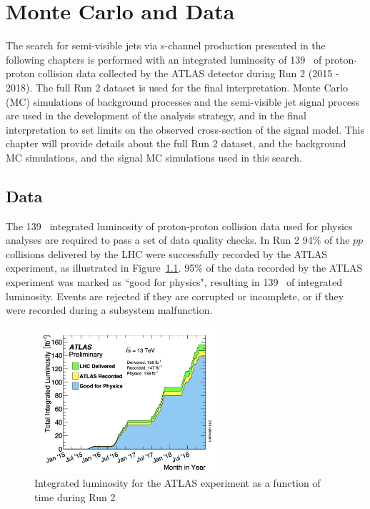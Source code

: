 \chapter{Monte Carlo and Data}
\label{ch:mc_data}

The search for semi-visible jets via s-channel production presented in the following chapters is performed with an integrated luminosity of 139 \fb~of proton-proton collision data collected by the ATLAS detector during Run 2 (2015 - 2018). The full Run 2 dataset is used for the final interpretation. Monte Carlo (MC) simulations of background processes and the semi-visible jet signal process are used in the development of the analysis strategy, and in the final interpretation to set limits on the observed cross-section of the signal model. This chapter will provide details about the full Run 2 dataset, and the background MC simulations, and the signal MC simulations used in this search. 

\section{Data}
The 139 \fb~integrated luminosity of proton-proton collision data used for physics analyses are required to pass a set of data quality checks. In Run 2 94\% of the $pp$ collisions delivered by the LHC were successfully recorded by the ATLAS experiment, as illustrated in Figure~\ref{fig:atlas_grl}. 95\% of the data recorded by the ATLAS experiment was marked as ``good for physics", resulting in 139 \fb~of integrated luminosity. Events are rejected if they are corrupted or incomplete, or if they were recorded during a subsystem malfunction. 

\begin{figure}
        \centering
	\includegraphics[width=0.62\textwidth]{figures/ch6/atlas_grl}
	\caption{Integrated luminosity for the ATLAS experiment as a function of time during Run 2 \cite{atlas_grl}
	\label{fig:atlas_grl}}
\end{figure}


